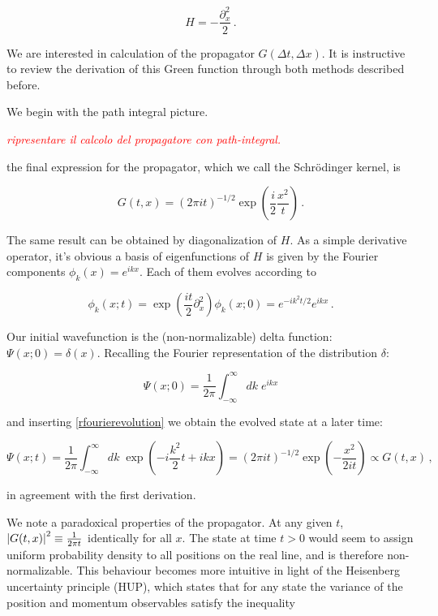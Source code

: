 \documentclass{article}
\newcommand{\cmnt}[1]{\textcolor{red}{\emph{#1}}}
\begin{document}
\begin{equation}
    H = - \frac{\partial_x^2}{2}\,.
\end{equation}

We are interested in calculation of the propagator $G(\Delta t, \Delta x)$. It is instructive to review the derivation of this Green function through both methods described before.

We begin with the path integral picture.

\cmnt{ripresentare il calcolo del propagatore con path-integral.}

the final expression for the propagator, which we call the Schr\"odinger kernel, is 

\begin{equation}
    G(t,x) = (2\pi i t)^{-1/2} \exp(\frac{i}{2} \frac{x^2}{t})\,.
\end{equation}

The same result can be obtained by diagonalization of $H$. As a simple derivative operator, it's obvious a basis of eigenfunctions of $H$ is given by the Fourier components $\phi_k(x) = e^{ikx}$. Each of them evolves according to

\begin{equation}
    \label{rfourierevolution}
    \phi_k(x; t) = \exp(\frac{it}{2}\partial_x^2) \phi_k(x;0) = e^{-ik^{2}t/2} e^{ikx}\,.
\end{equation}

Our initial wavefunction is the (non-normalizable) delta function: $\Psi(x;0) = \delta(x)$. Recalling the Fourier representation of the distribution $\delta$:

\begin{equation}
    \Psi(x;0) = \frac{1}{2\pi} \int_{-\infty}^\infty dk \; e^{ikx} 
\end{equation}

and inserting \eqref{rfourierevolution} we obtain the evolved state at a later time:

\begin{equation}
    \Psi(x;t) = \frac{1}{2\pi} \int_{-\infty}^{\infty} dk \; \exp( - i \frac{k^2}{2}t +  ikx ) = (2 \pi i t)^{-1/2} \exp(-\frac{x^2}{2it}) \propto G(t,x)\,,
\end{equation}

in agreement with the first derivation.

We note a paradoxical properties of the propagator. At any given $t$, $\abs{G(t,x)}^2 \equiv \frac{1}{2\pi t}$ identically for all $x$. The state at time $t>0$ would seem to assign uniform probability density to all positions on the real line, and is therefore non-normalizable. This behaviour becomes more intuitive in light of the Heisenberg uncertainty principle (HUP), which states that for any state the variance of the position and momentum observables satisfy the inequality
\end{document}
